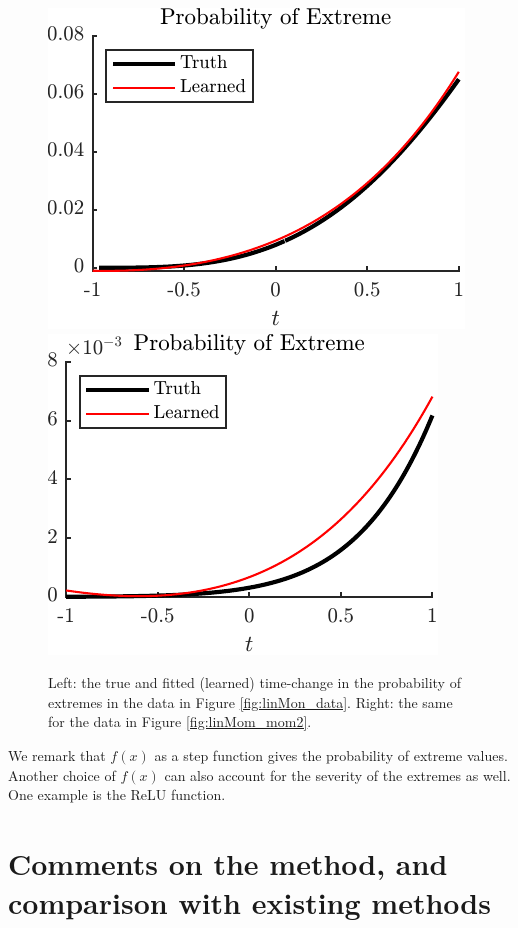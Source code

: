 \documentclass[11pt,letterpaper]{article}
\begin{document}
\begin{figure}
    \centering
    \includegraphics{figs/linMom_extreme}\hspace{10mm}
    \includegraphics{figs/linMom_extreme2}
    \caption{Left: the true and fitted (learned) time-change in the probability of extremes in the data in Figure \ref{fig:linMon_data}. Right: the same for the data in Figure \ref{fig:linMom_mom2}.}
    \label{fig:linMom_extreme}
\end{figure}

We remark that $f(x)$ as a step function gives the probability of extreme values. Another choice of $f(x)$ can also account for the severity of the extremes as well. One example is the ReLU function. 

\section{Comments on the method, and comparison with existing methods}
\end{document}

